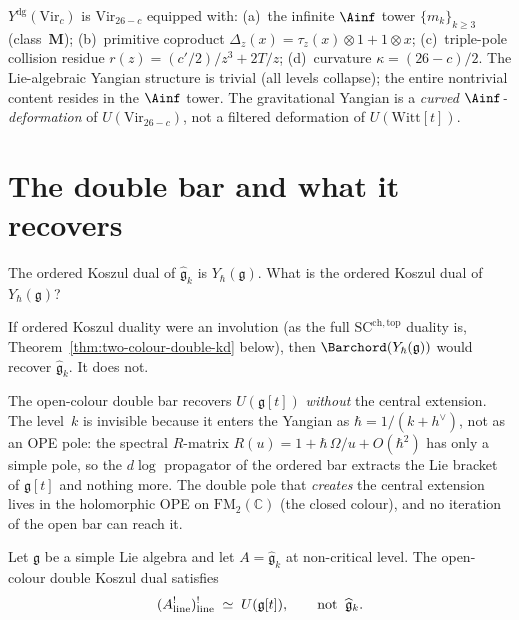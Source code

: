 \begin{remark}
\label{rem:grav-yangian-summary}
$Y^{\mathrm{dg}}(\mathrm{Vir}_c)$ is $\mathrm{Vir}_{26-c}$ equipped
with:
\textup{(a)}~the infinite $\Ainf$ tower $\{m_k\}_{k \ge 3}$
\textup{(}class~$\mathbf{M}$\textup{)};
\textup{(b)}~primitive coproduct
$\Delta_z(x) = \tau_z(x) \otimes 1 + 1 \otimes x$;
\textup{(c)}~triple-pole collision residue
$r(z) = (c'/2)/z^3 + 2T/z$;
\textup{(d)}~curvature $\kappa = (26-c)/2$.
The Lie-algebraic Yangian structure is trivial (all levels collapse);
the entire nontrivial content resides in the $\Ainf$ tower. The
gravitational Yangian is a \emph{curved $\Ainf$-deformation}
of $U(\mathrm{Vir}_{26-c})$, not a filtered deformation of
$U(\mathrm{Witt}[t])$.
\end{remark}


\section{The double bar and what it recovers}
\label{sec:double-bar}

The ordered Koszul dual of $\widehat{\mathfrak{g}}_k$ is
$Y_\hbar(\mathfrak{g})$. What is the ordered Koszul dual of
$Y_\hbar(\mathfrak{g})$?

If ordered Koszul duality were an involution (as the full
$\mathrm{SC}^{\mathrm{ch,top}}$ duality is,
Theorem~\ref{thm:two-colour-double-kd} below), then
$\Barchord(Y_\hbar(\mathfrak{g}))$ would recover
$\widehat{\mathfrak{g}}_k$. It does not.

The open-colour double bar recovers $U(\mathfrak{g}[t])$
\emph{without} the central extension. The level~$k$ is invisible
because it enters the Yangian as $\hbar = 1/(k{+}h^\vee)$, not as an
OPE pole: the spectral $R$-matrix $R(u) = 1 + \hbar\,\Omega/u +
O(\hbar^2)$ has only a simple pole, so the $d\log$ propagator of the
ordered bar extracts the Lie bracket of $\mathfrak{g}[t]$ and nothing
more. The double pole that \emph{creates} the central extension lives
in the holomorphic OPE on $\mathrm{FM}_2(\mathbb{C})$ (the closed
colour), and no iteration of the open bar can reach it.

\begin{theorem}
\ClaimStatusProvedHere
\label{thm:central-extension-invisible}
\label{thm:double-bar-sl2}
Let $\mathfrak{g}$ be a simple Lie algebra and let
$A = \widehat{\mathfrak{g}}_k$ at non-critical level. The open-colour
double Koszul dual satisfies
\[
(A^{!}_{\mathrm{line}})^{!}_{\mathrm{line}}
\;\simeq\;
U(\mathfrak{g}[t]),
\qquad
\textup{not}\;\;
\widehat{\mathfrak{g}}_k.
\]
\end{theorem}

